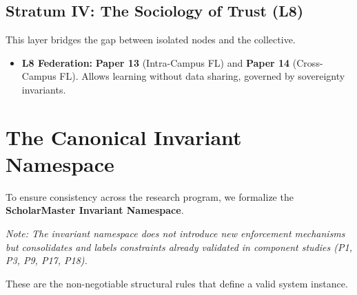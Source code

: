 \documentclass[conference]{IEEEtran}
\theoremstyle{definition}
\begin{document}
\subsection{Stratum IV: The Sociology of Trust (L8)}
This layer bridges the gap between isolated nodes and the collective.
\begin{itemize}
    \item \textbf{L8 Federation:} \textbf{Paper 13} (Intra-Campus FL) and \textbf{Paper 14} (Cross-Campus FL). Allows learning without data sharing, governed by sovereignty invariants.
\end{itemize}

\section{The Canonical Invariant Namespace}

To ensure consistency across the research program, we formalize the \textbf{ScholarMaster Invariant Namespace}. 

\textit{Note: The invariant namespace does not introduce new enforcement mechanisms but consolidates and labels constraints already validated in component studies (P1, P3, P9, P17, P18).}

These are the non-negotiable structural rules that define a valid system instance.
\end{document}
